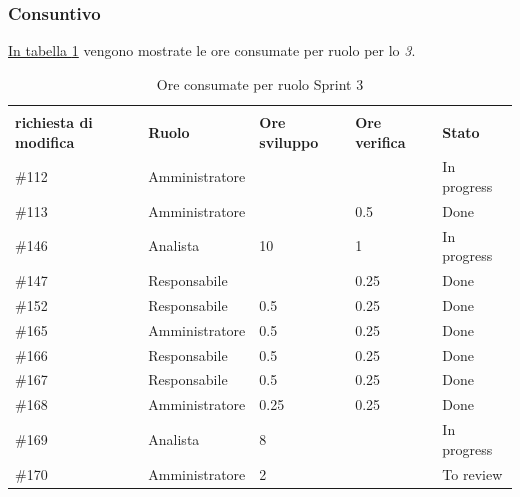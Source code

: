 \subsubsection{Consuntivo}

\hyperref[tab:sprint3_ore_consumate]{In tabella \ref{tab:sprint3_ore_consumate}} vengono mostrate le ore consumate per ruolo per lo \textit{ 3}.

\begin{table}[H]
    \centering
    \begin{tabular}{| l | l | l | l | l |}
        \hline
            \makecell{\textbf{Identificativo} \\ \textbf{richiesta di modifica}} &
            \textbf{Ruolo} & 
            \textbf{Ore sviluppo} &
            \textbf{Ore verifica} & 
            \textbf{Stato}\\ 
        \hline
            \#112 & Amministratore &  & & In progress\\
        \hline
            \#113 & Amministratore &  & 0.5 & Done\\
        \hline
            \#146 & Analista & 10 & 1 & In progress\\
        \hline
            \#147 & Responsabile &  & 0.25 & Done \\
        \hline
            \#152 & Responsabile & 0.5 & 0.25 & Done\\
        \hline
            \#165 & Amministratore & 0.5 & 0.25 & Done\\
        \hline
            \#166 & Responsabile & 0.5 & 0.25 & Done\\
        \hline
            \#167 & Responsabile & 0.5 & 0.25 & Done\\
        \hline
            \#168 & Amministratore & 0.25 & 0.25 & Done\\
        \hline
            \#169 & Analista & 8 & & In progress\\
        \hline
            \#170 & Amministratore & 2 & & To review\\
        \hline
    \end{tabular}
    \caption{Ore consumate per ruolo Sprint 3}
    \label{tab:sprint3_ore_consumate} 
\end{table}